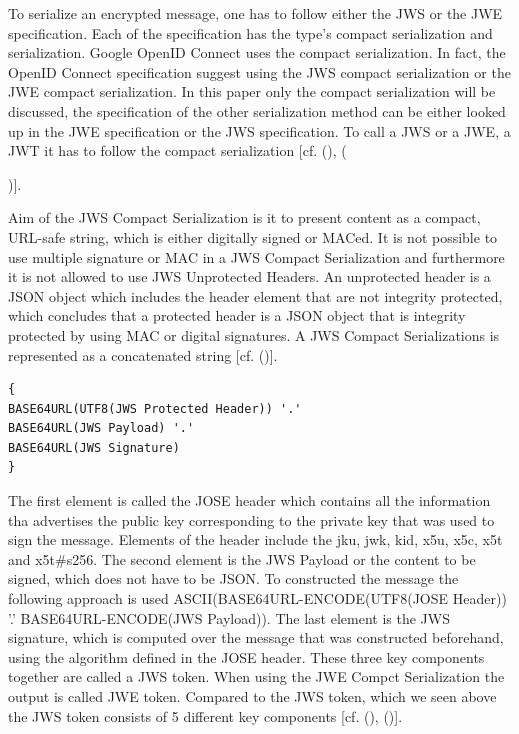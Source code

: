 To serialize an encrypted message, one has to follow either the JWS or the JWE specification. Each of the specification has the type’s compact serialization and serialization. Google OpenID Connect uses the compact serialization. In fact, the OpenID Connect specification suggest using the JWS compact serialization or the JWE compact serialization. In this paper only the compact serialization will be discussed, the specification of the other serialization method can be either looked up in the JWE specification or the JWS specification. To call a JWS or a JWE, a JWT it has to follow the compact serialization [cf. (\cite{JWS:IETF:Jones:2015}), ({\cite{JWE:IETF:Jones:2015})].
	
Aim of the JWS Compact Serialization is it to present content as a compact, URL-safe string, which is either digitally signed or MACed. It is not possible to use multiple signature or MAC in a JWS Compact Serialization and furthermore it is not allowed to use JWS Unprotected Headers. An unprotected header is a JSON object which includes the header element that are not integrity protected, which concludes that a protected header is a JSON object that is integrity protected by using MAC or digital signatures. A JWS Compact Serializations is represented as a concatenated string [cf. (\cite{JWS:IETF:Jones:2015})].

\begin{lstlisting}
{
BASE64URL(UTF8(JWS Protected Header)) '.'
BASE64URL(JWS Payload) '.'
BASE64URL(JWS Signature)
}
\end{lstlisting}

The first element is called the JOSE header which contains all the information tha advertises the public key corresponding to the private key that was used to sign the message. Elements of the header include the jku, jwk, kid, x5u, x5c, x5t and x5t\#s256. The second element is the JWS Payload or the content to be signed, which does not have to be JSON. To constructed the message the following approach is used  ASCII(BASE64URL-ENCODE(UTF8(JOSE Header)) '.' BASE64URL-ENCODE(JWS Payload)). 
The last element is the JWS signature, which is computed over the message that was constructed beforehand, using the algorithm defined in the JOSE header. These three key components together are called a JWS token. When using the JWE Compct Serialization the output is called JWE token. Compared to the JWS token, which we seen above the JWS token consists of 5 different key components [cf. (\cite{JWS:IETF:Jones:2015}), (\cite{JWE:IETF:Jones:2015})].


}
